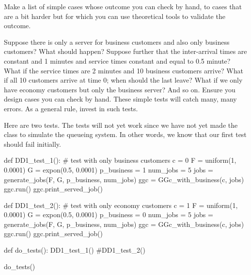 \begin{exercise}
  Make a list of  simple cases whose outcome you can check by hand, to cases that are a bit harder but for which  you can use theoretical tools to validate the outcome.
\begin{hint}
    Suppose there is only a server for business customers and also only business customers?
    What should happen?
    Suppose further that the inter-arrival times are constant and 1 minutes and service times constant and equal to 0.5 minute?
    What if the service times are 2 minutes and 10 business customers arrive?
    What if all 10 customers arrive at time 0; when should the last leave?
    What if we only have economy customers but only the business server?
    And so on.
    Ensure you design cases you can check by hand.
    These simple tests will catch many, many errors.
    As a general rule, invest in such tests.
\end{hint}


\begin{solution}
    Here are two tests.
    The tests will not yet work since we have not yet made the class to simulate the queueing system.
    In other words, we know that our first test should fail initially.

    \begin{pynotangle}
def DD1_test_1():
    # test with only business customers
    c = 0
    F = uniform(1, 0.0001)
    G = expon(0.5, 0.0001)
    p_business = 1
    num_jobs = 5
    jobs = generate_jobs(F, G, p_business, num_jobs)
    ggc = GGc_with_business(c, jobs)
    ggc.run()
    ggc.print_served_job()


def DD1_test_2():
    # test with only economy customers
    c = 1
    F = uniform(1, 0.0001)
    G = expon(0.5, 0.0001)
    p_business = 0
    num_jobs = 5
    jobs = generate_jobs(F, G, p_business, num_jobs)
    ggc = GGc_with_business(c, jobs)
    ggc.run()
    ggc.print_served_job()

def do_tests():
    DD1_test_1()
    #DD1_test_2()

do_tests()
    \end{pynotangle}

  \end{solution}

\end{exercise}


